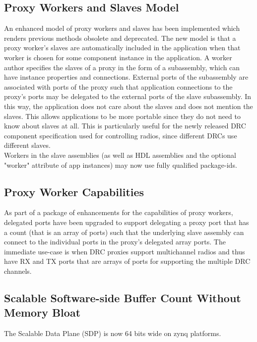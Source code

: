 \subsection{Proxy Workers and Slaves Model}
\label{sec:21_infer_slaves}
An enhanced model of proxy workers and slaves has been implemented which renders previous methods obsolete and deprecated.  The new model is that a proxy worker's slaves are automatically included in the application when that worker is chosen for some component instance in the application.  A worker author specifies the slaves of a proxy in the form of a subassembly, which can have instance properties and connections.  External ports of the subassembly are associated with ports of the proxy such that application connections to the proxy's ports may be delegated to the external ports of the slave subassembly.
In this way, the application does not care about the slaves and does not mention the slaves.  This allows applications to be more portable since they do not need to know about slaves at all.  This is particularly useful for the newly released DRC component specification used for controlling radios, since different DRCs use different slaves.\\

Workers in the slave assemblies (as well as HDL assemblies and the optional "worker" attribute of app instances) may now use fully qualified package-ids.

\subsection{Proxy Worker Capabilities}
\label{sec:21_proxy_capabilities}
As part of a package of enhancements for the capabilities of proxy workers,
delegated ports have been upgraded to support delegating a proxy port that
has a count (that is an array of ports) such that the underlying slave
assembly can connect to the individual ports in the proxy's delegated array
ports.  The immediate use-case is when DRC proxies support multichannel
radios and thus have RX and TX ports that are arrays of ports for supporting
the multiple DRC channels.

\subsection{Scalable Software-side Buffer Count Without Memory Bloat}
\label{sec:21_sdp_width}
The Scalable Data Plane (SDP) is now 64 bits wide on zynq platforms.\\

